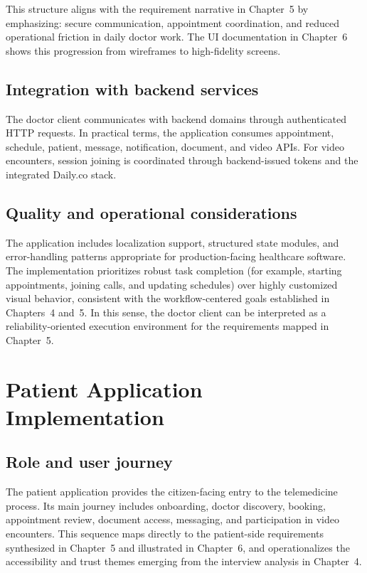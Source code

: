 \documentclass[11pt,a4paper,twoside,openany,headings=normal]{scrreprt}
\begin{document}
This structure aligns with the requirement narrative in Chapter~5 by emphasizing: secure communication, appointment coordination, and reduced operational friction in daily doctor work. The UI documentation in Chapter~6 shows this progression from wireframes to high-fidelity screens.

\section{Integration with backend services}

The doctor client communicates with backend domains through authenticated HTTP requests. In practical terms, the application consumes appointment, schedule, patient, message, notification, document, and video APIs. For video encounters, session joining is coordinated through backend-issued tokens and the integrated Daily.co stack.

\section{Quality and operational considerations}

The application includes localization support, structured state modules, and error-handling patterns appropriate for production-facing healthcare software. The implementation prioritizes robust task completion (for example, starting appointments, joining calls, and updating schedules) over highly customized visual behavior, consistent with the workflow-centered goals established in Chapters~4 and~5. In this sense, the doctor client can be interpreted as a reliability-oriented execution environment for the requirements mapped in Chapter~5.
\ShifaFigTestBars

\chapter{Patient Application Implementation}
\label{ch:patient-implementation}

\section{Role and user journey}

The patient application provides the citizen-facing entry to the telemedicine process. Its main journey includes onboarding, doctor discovery, booking, appointment review, document access, messaging, and participation in video encounters. This sequence maps directly to the patient-side requirements synthesized in Chapter~5 and illustrated in Chapter~6, and operationalizes the accessibility and trust themes emerging from the interview analysis in Chapter~4.
\end{document}
